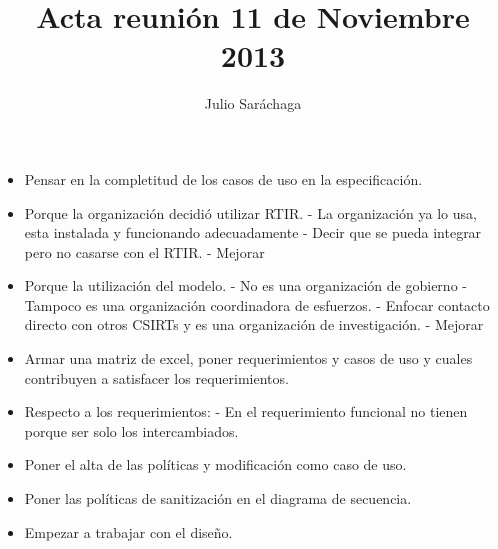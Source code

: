 \documentclass[11pt]{article}
\title{Acta reunión 11 de Noviembre 2013}
\author{Julio Saráchaga}
\date{}
\begin{document}
\maketitle

\begin{itemize}
  \item Pensar en la completitud de los casos de uso en la especificación.
  \item Porque la organización decidió utilizar RTIR.
	  \subitem - La organización ya lo usa, esta instalada y funcionando adecuadamente
	  \subitem - Decir que se pueda integrar pero no casarse con el RTIR.
	  \subitem - Mejorar
 \item Porque la utilización del modelo.
	\subitem - No es una organización de gobierno
	\subitem - Tampoco es una organización coordinadora de esfuerzos.
	\subitem - Enfocar contacto directo con otros CSIRTs y es una organización de investigación.
	\subitem - Mejorar
  \item Armar una matriz de excel, poner requerimientos y casos de uso y cuales contribuyen a satisfacer los requerimientos.
  \item Respecto a los requerimientos:
    \subitem - En el requerimiento funcional no tienen porque ser solo los intercambiados.
  \item Poner el alta de las políticas y modificación como caso de uso.
  \item Poner las políticas de sanitización en el diagrama de secuencia.
  \item Empezar a trabajar con el diseño.
\end{itemize}
\end{document}
